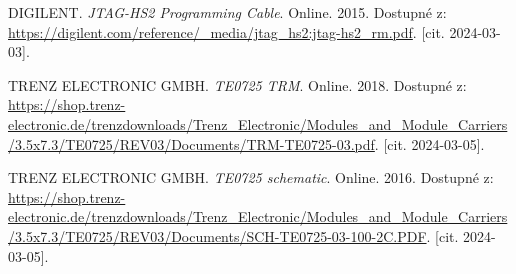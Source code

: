 \begin{thebibliography}{99}
DIGILENT. \textit{JTAG-HS2 Programming Cable}. Online. 2015. Dostupné z: \url{https://digilent.com/reference/\_media/jtag\_hs2:jtag-hs2\_rm.pdf}. [cit. 2024-03-03].

TRENZ ELECTRONIC GMBH. \textit{TE0725 TRM}. Online. 2018. Dostupné z: \url{https://shop.trenz-electronic.de/trenzdownloads/Trenz\_Electronic/Modules\_and\_Module\_Carriers/3.5x7.3/TE0725/REV03/Documents/TRM-TE0725-03.pdf}. [cit. 2024-03-05].

TRENZ ELECTRONIC GMBH. \textit{TE0725 schematic}. Online. 2016. Dostupné z: \url{https://shop.trenz-electronic.de/trenzdownloads/Trenz\_Electronic/Modules\_and\_Module\_Carriers/3.5x7.3/TE0725/REV03/Documents/SCH-TE0725-03-100-2C.PDF}. [cit. 2024-03-05].

\end{thebibliography}


%
%
%
